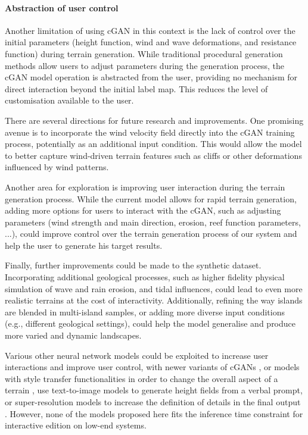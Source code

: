 \paragraph{Abstraction of user control} Another limitation of using cGAN in this context is the lack of control over the initial parameters (height function, wind and wave deformations, and resistance function) during terrain generation. While traditional procedural generation methods allow users to adjust parameters during the generation process, the cGAN model operation is abstracted from the user, providing no mechanism for direct interaction beyond the initial label map. This reduces the level of customisation available to the user.



There are several directions for future research and improvements. One promising avenue is to incorporate the wind velocity field directly into the cGAN training process, potentially as an additional input condition. This would allow the model to better capture wind-driven terrain features such as cliffs or other deformations influenced by wind patterns.

Another area for exploration is improving user interaction during the terrain generation process. While the current model allows for rapid terrain generation, adding more options for users to interact with the cGAN, such as adjusting parameters (wind strength and main direction, erosion, reef function parameters, ...), could improve control over the terrain generation process of our system and help the user to generate his target results.

Finally, further improvements could be made to the synthetic dataset. Incorporating additional geological processes, such as higher fidelity physical simulation of wave and rain erosion, and tidal influences, could lead to even more realistic terrains at the cost of interactivity. Additionally, refining the way islands are blended in multi-island samples, or adding more diverse input conditions (e.g., different geological settings), could help the model generalise and produce more varied and dynamic landscapes.

Various other neural network models could be exploited to increase user interactions and improve user control, with newer variants of cGANs \cite{Park2019}, or models with style transfer functionalities \cite{Gatys2015,Zhu2020} in order to change the overall aspect of a terrain \cite{Perche2023a,Perche2023b}, use text-to-image models \cite{Rombach2021,Radford2021} to generate height fields from a verbal prompt, or super-resolution models \cite{Dong2014} to increase the definition of details in the final output \cite{Guerin2016a}. However, none of the models proposed here fits the inference time constraint for interactive edition on low-end systems.
